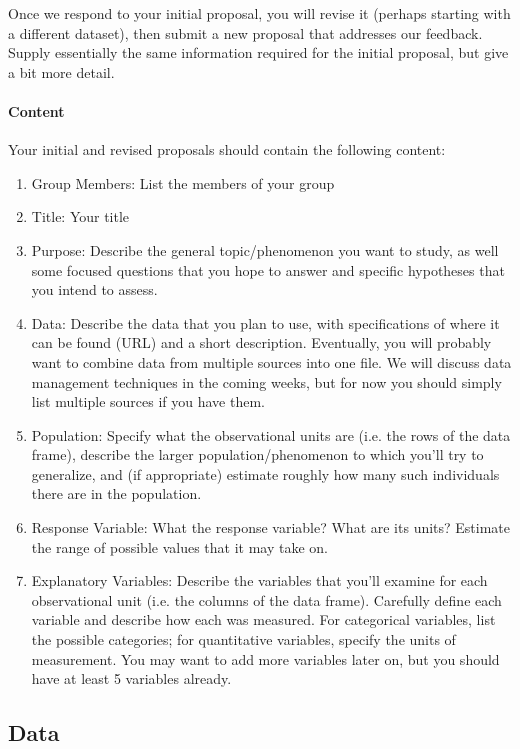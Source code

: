\documentclass[10pt]{article}
\begin{document}
Once we respond to your initial proposal, you will revise it (perhaps starting with a different dataset), then submit a new proposal that addresses our feedback.  Supply essentially the same information required for the initial proposal, but give a bit more detail. 

\paragraph{Content}

Your initial and revised proposals should contain the following content:

\begin{enumerate}
	\item Group Members: List the members of your group
	\item Title: Your title
	\item Purpose: Describe the general topic/phenomenon you want to study, as well some focused questions that you hope to answer and specific hypotheses that you intend to assess.
	\item Data: Describe the data that you plan to use, with specifications of where it can be found (URL) and a short description. Eventually, you will probably want to combine data from multiple sources into one file. We will discuss data management techniques in the coming weeks, but for now you should simply list multiple sources if you have them. 
	\item Population: Specify what the observational units are (i.e. the rows of the data frame), describe the larger population/phenomenon to which you'll try to generalize, and (if appropriate) estimate roughly how many such individuals there are in the population.
	\item Response Variable: What the response variable? What are its units? Estimate the range of possible values that it may take on. 
	\item Explanatory Variables: Describe the variables that you'll examine for each observational unit (i.e. the columns of the data frame). Carefully define each variable and describe how each was measured. For categorical variables, list the possible categories; for quantitative variables, specify the units of measurement. You may want to add more variables later on, but you should have at least 5 variables already. 
\end{enumerate}

\subsection{Data}
\end{document}
